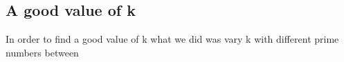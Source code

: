\subsection{A good value of k}

In order to find a good value of k what we did was vary k with different prime numbers between 


